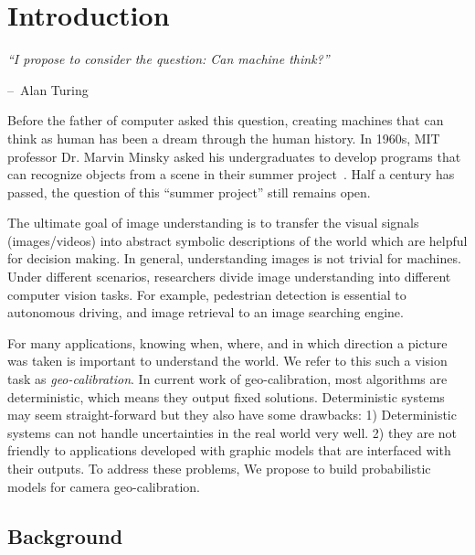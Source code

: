 \chapter{Introduction}
\label{chap:intro}

\makeatletter
\newenvironment{chapquote}[2][2em]
{\setlength{\@tempdima}{#1} \def\chapquote@author{#2} \parshape 1
  \@tempdima \dimexpr\textwidth-2\@tempdima\relax \itshape}
{\par\normalfont\hfill--\
\chapquote@author\hspace*{\@tempdima}\par\bigskip}
\makeatother

\begin{chapquote}{Alan Turing}
  ``I propose to consider the question: Can machine think?''
\end{chapquote}

Before the father of computer asked this question, creating
machines that can think as human has been a dream through the human
history. In 1960s, MIT professor Dr. Marvin Minsky asked his
undergraduates to develop programs that can recognize objects from a
scene in their summer project~\cite{boden2006mind}. Half a century has
passed, the question of this ``summer project'' still remains open.

The ultimate goal of image understanding is to transfer the visual
signals (images/videos) into abstract symbolic descriptions of the
world which are helpful for decision making.
In general, understanding images is not trivial for machines.
Under different scenarios, researchers divide image
understanding into different computer vision tasks. For example,
pedestrian detection is essential to autonomous driving, and image
retrieval to an image searching engine.

For many applications, knowing when, where, and in which direction a
picture was taken is important to understand the world. We refer to
this such a vision task as {\em geo-calibration}.
In current work of geo-calibration, most algorithms are
deterministic, which means they output fixed solutions. Deterministic
systems may seem straight-forward but they also have some 
drawbacks: 1) Deterministic systems can not handle uncertainties in
the real world very well. 2) they are not
friendly to applications developed with graphic models that are
interfaced with their outputs. To address these problems, We propose
to build probabilistic models for camera geo-calibration.

\section{Background}

